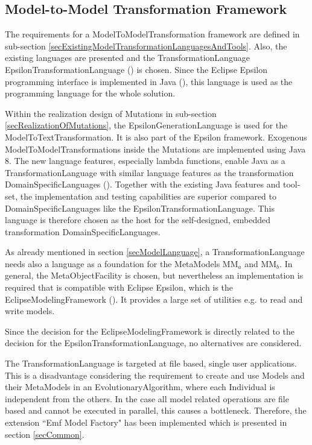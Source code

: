 \subsection{Model-to-Model Transformation Framework}
\label{ModelToModelTransformationFramework}

The requirements for a \gls{ModelToModelTransformation} framework are defined in sub-section \ref{secExistingModelTransformationLanguagesAndTools}. Also, the existing languages are presented and the \gls{TransformationLanguage} \gls{EpsilonTransformationLanguage} (\cite{Kolovos2013}) is chosen. Since the Eclipse Epsilon programming interface is implemented in Java (\cite{Oracle}), this language is used as the programming language for the whole solution.

Within the realization design of \glspl{Mutation} in sub-section \ref{secRealizationOfMutations}, the \gls{EpsilonGenerationLanguage} is used for the \gls{ModelToTextTransformation}. It is also part of the Epsilon framework. \Gls{Exogenous} \glspl{ModelToModelTransformation} inside the \glspl{Mutation} are implemented using Java 8. The new language features, especially lambda functions, enable Java as a \gls{TransformationLanguage} with similar language features as the transformation \glspl{DomainSpecificLanguage} (\cite{Rachev2012}). Together with the existing Java features and tool-set, the implementation and testing capabilities are superior compared to \glspl{DomainSpecificLanguage} like the \gls{EpsilonTransformationLanguage}. This language is therefore chosen as the host for the self-designed, embedded transformation \glspl{DomainSpecificLanguage}. %

As already mentioned in section \ref{secModelLanguage}, a \gls{TransformationLanguage} needs also a language as a foundation for the \glspl{MetaModel} MM$_a$ and MM$_b$. In general, the \gls{MetaObjectFacility} is chosen, but nevertheless an implementation is required that is compatible with Eclipse Epsilon, which is the \gls{EclipseModelingFramework} (\cite{EMF}). It provides a large set of utilities e.g. to read and write models. 

Since the decision for the \gls{EclipseModelingFramework} is directly related to the decision for the \gls{EpsilonTransformationLanguage}, no alternatives are considered.

The \gls{TransformationLanguage} is targeted at file based, single user applications. This is a disadvantage considering the requirement to create and use \glspl{Model} and their \glspl{MetaModel} in an \gls{EvolutionaryAlgorithm}, where each \gls{Individual} is independent from the others. In the case all model related operations are file based and cannot be executed in parallel, this causes a bottleneck. Therefore, the extension ``Emf Model Factory" has been implemented which is presented in section \ref{secCommon}.

